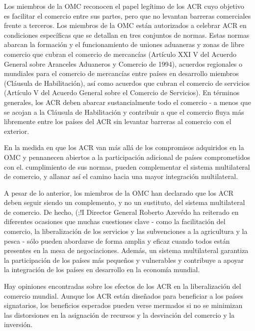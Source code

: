 \documentclass[10pt,a4paper]{article}
\begin{document}
Los miembros de la OMC reconocen el papel legítimo de los ACR cuyo objetivo es facilitar el comercio entre sus partes, pero que no levantan barreras comerciales frente a terceros. Los miembros de la OMC están autorizados a celebrar ACR en condiciones específicas que se detallan en tres conjuntos de normas. Estas normas abarcan la formación y el funcionamiento de uniones aduaneras y zonas de libre comercio que cubran el comercio de mercancías (Artículo XXI V del Acuerdo General sobre Aranceles Aduaneros y Comercio de 1994), acuerdos regionales o mundiales para el comercio de mercancías entre países en desarrollo miembros (Cláusula de Habilitación), así como acuerdos que cubran el comercio de servicios (Artículo V del Acuerdo General sobre el Comercio de Servicios). En términos generales, los ACR deben abarcar sustancialmente todo el comercio - a menos que se acojan a la Cláusula de Habilitación y contribuir a que el comercio fluya más libremente entre los países del ACR sin levantar barreras al comercio con el exterior.

En la medida en que los ACR van más allá de los compromisos adquiridos en la OMC y pennanecen abiertos a la participación adicional de países comprometidos con el. cumplimiento de sus normas, pueden complementar el sistema multilateral de comercio, y allanar así el camino hacia una mayor integración multilateral.

A pesar de lo anterior, los miembros de la OMC han declarado que los ACR deben seguir siendo un complemento, y no un sustituto, del sistema multilateral de comercio. De hecho, (;!I Director General Roberto Azevédo ha reiterado en diferentes ocasiones que muchas cuestiones clave - como la facilitación del comercio, la liberalización de los servicios y las subvenciones a la agricultura y la pesca - sólo pueden abordarse de forma amplia y eficaz cuando todos están presentes en la mesa de negociaciones. Además, un sistema multilateral garantiza la participación de los países más pequeños y vulnerables y contribuye a apoyar la integración de los países en desarrollo en la economía mundial.

Hay opiniones encontradas sobre los efectos de los ACR en la liberalización del comercio mundial. Aunque los ACR están diseñados para beneficiar a los países signatarios, los beneficios esperados pueden verse mermados si no se minimizan las distorsiones en la asignación de recursos y la desviación del comercio y la inversión.
\end{document}
